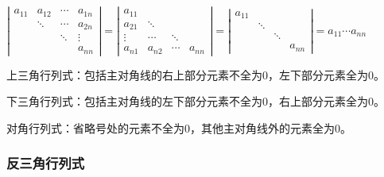 \documentclass[UTF8, 12pt]{ctexart}
\begin{document}
$\left|\begin{array}{cccc} 
    a_{11} & a_{12} & \cdots & a_{1n} \\
     & \ddots & \cdots & a_{2n} \\
     & & \ddots & \vdots  \\
     & & & a_{nn}
\end{array}\right|=
\left|\begin{array}{cccc} 
    a_{11} & & & \\
    a_{21} & \ddots & & \\
    \vdots & \cdots & \ddots &  \\
    a_{n1} & a_{n2} & \cdots & a_{nn}
\end{array}\right|=
\left|\begin{array}{cccc} 
    a_{11} & & & \\
     & \ddots & & \\
     & & \ddots &  \\
     & & & a_{nn}
\end{array}\right|=a_{11}\cdots a_{nn}$

上三角行列式：包括主对角线的右上部分元素不全为0，左下部分元素全为0。


下三角行列式：包括主对角线的左下部分元素不全为0，右上部分元素全为0。


对角行列式：省略号处的元素不全为0，其他主对角线外的元素全为0。

\subsubsection{反三角行列式}
\end{document}
